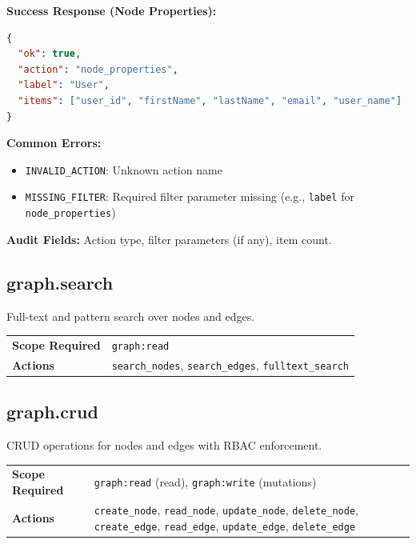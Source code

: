 \textbf{Success Response (Node Properties):}
\begin{lstlisting}[language=json]
{
  "ok": true,
  "action": "node_properties",
  "label": "User",
  "items": ["user_id", "firstName", "lastName", "email", "user_name"]
}
\end{lstlisting}

\textbf{Common Errors:}
\begin{itemize}
    \item \texttt{INVALID\_ACTION}: Unknown action name
    \item \texttt{MISSING\_FILTER}: Required filter parameter missing (e.g., \texttt{label} for \texttt{node\_properties})
\end{itemize}

\textbf{Audit Fields:} Action type, filter parameters (if any), item count.

\subsection{graph.search}

Full-text and pattern search over nodes and edges.

\begin{table}[ht]
\centering
\small
\begin{tabularx}{\textwidth}{lX}
    \hline
    \textbf{Scope Required} & \texttt{graph:read} \\
    \textbf{Actions} & \texttt{search\_nodes}, \texttt{search\_edges}, \texttt{fulltext\_search} \\
    \hline
\end{tabularx}
\end{table}

\subsection{graph.crud}

CRUD operations for nodes and edges with RBAC enforcement.

\begin{table}[ht]
\centering
\small
\begin{tabularx}{\textwidth}{lX}
    \hline
    \textbf{Scope Required} & \texttt{graph:read} (read), \texttt{graph:write} (mutations) \\
    \textbf{Actions} & \texttt{create\_node}, \texttt{read\_node}, \texttt{update\_node}, \texttt{delete\_node}, \texttt{create\_edge}, \texttt{read\_edge}, \texttt{update\_edge}, \texttt{delete\_edge} \\
    \hline
\end{tabularx}
\end{table}

